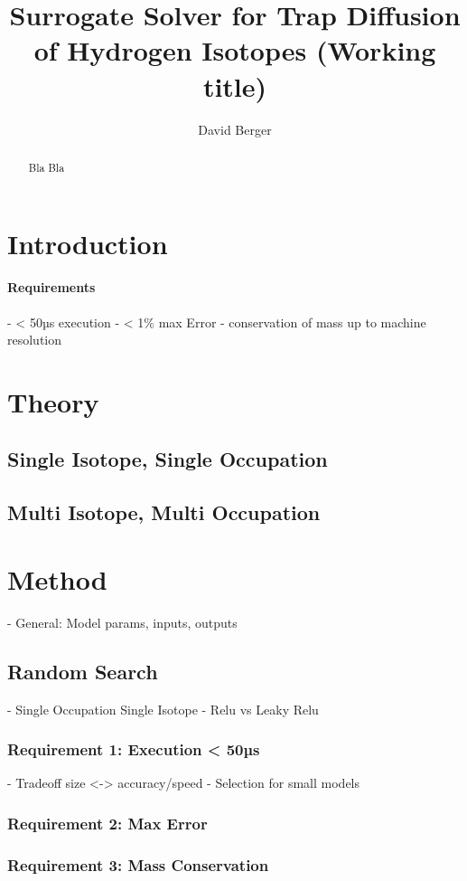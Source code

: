 
\title{Surrogate Solver for Trap Diffusion of Hydrogen Isotopes (Working title)}
\author{David Berger}


\begin{abstract}
    Bla Bla
\end{abstract}

\section{Introduction}
\paragraph{Requirements}
- < 50µs execution
- < 1\% max Error
- conservation of mass up to machine resolution
\section{Theory}
\subsection{Single Isotope, Single Occupation}
\subsection{Multi Isotope, Multi Occupation}
\section{Method}
- General: Model params, inputs, outputs
\subsection{Random Search}
- Single Occupation Single Isotope
- Relu vs Leaky Relu
\subsubsection{Requirement 1: Execution < 50µs}
- Tradeoff size <-> accuracy/speed
- Selection for small models

\subsubsection{Requirement 2: Max Error}

\subsubsection{Requirement 3: Mass Conservation}

